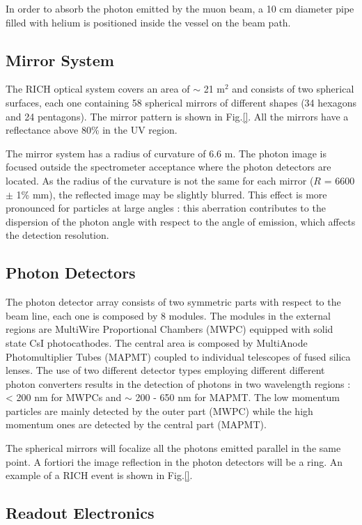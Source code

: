 In order to absorb the photon emitted by the muon beam, a 10 cm diameter pipe filled with helium is positioned inside the vessel on the beam path.

\subsection*{Mirror System}

The RICH optical system covers an area of $\sim$ 21 m$^2$ and consists of two spherical surfaces, each one containing 58 spherical mirrors of different
shapes (34 hexagons and 24 pentagons). The mirror pattern is shown in Fig.\ref{}. All the mirrors have a reflectance above 80\% in the UV region.

The mirror system has a radius of curvature of 6.6 m. The photon image is focused outside the spectrometer acceptance where the photon detectors are located.
As the radius of the curvature is not the same for each mirror ($R$ = 6600 $\pm$ 1\% mm), the reflected image may be slightly blurred. This effect is more
pronounced for particles at large angles : this aberration contributes to the dispersion of the photon angle with respect to the angle of emission, which affects
the detection resolution.

\subsection*{Photon Detectors}

The photon detector array consists of two symmetric parts with respect to the beam line, each one is composed by 8 modules. The modules in the external regions
are MultiWire Proportional Chambers (MWPC) equipped with solid state CsI photocathodes\cite{}. The central area is composed by MultiAnode Photomultiplier Tubes
(MAPMT)\cite{} coupled to individual telescopes of fused silica lenses. The use of two different detector types employing different different photon converters
results in the detection of photons in two wavelength regions : < 200 nm for MWPCs and $\sim$ 200 - 650 nm for MAPMT. The low momentum particles are mainly detected
by the outer part (MWPC) while the high momentum ones are detected by the central part (MAPMT).

The spherical mirrors will focalize all the photons emitted parallel in the same point. A fortiori the image reflection in the photon detectors will be a ring.
An example of a RICH event is shown in Fig.\ref{}.

\subsection*{Readout Electronics}


